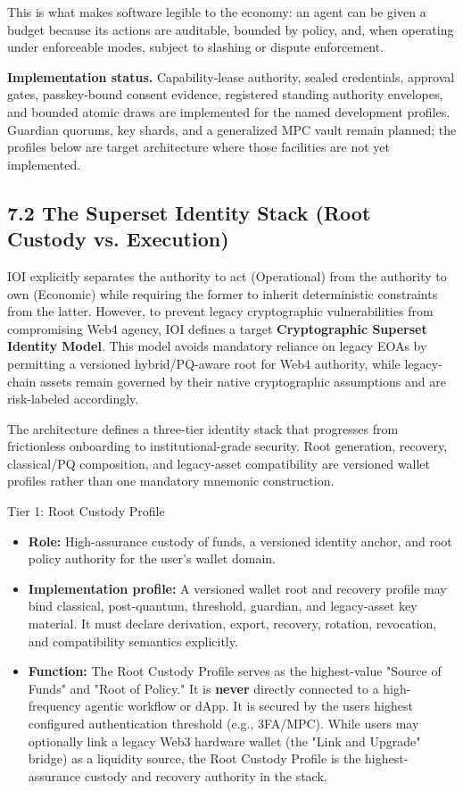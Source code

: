 \documentclass[
  11pt,
]{article}
\providecommand{\tightlist}{%
  \setlength{\itemsep}{0pt}\setlength{\parskip}{0pt}}
\begin{document}
This is what makes software legible to the economy: an agent can be
given a budget because its actions are auditable, bounded by policy,
and, when operating under enforceable modes, subject to slashing or
dispute enforcement.

\textbf{Implementation status.} Capability-lease authority, sealed
credentials, approval gates, passkey-bound consent evidence, registered
standing authority envelopes, and bounded atomic draws are implemented for the
named development profiles. Guardian quorums, key shards, and a generalized MPC
vault remain planned; the profiles below are target architecture where those
facilities are not yet implemented.

\hypertarget{the-superset-identity-stack-master-vs.-ops}{%
\subsection{7.2 The Superset Identity Stack (Root Custody vs.
Execution)}\label{the-superset-identity-stack-master-vs.-ops}}

IOI explicitly separates the authority to act (Operational) from the
authority to own (Economic) while requiring the former to inherit
deterministic constraints from the latter. However, to prevent legacy
cryptographic vulnerabilities from compromising Web4 agency, IOI
defines a target \textbf{Cryptographic Superset Identity Model}. This model
avoids mandatory reliance on legacy EOAs by permitting a versioned
hybrid/PQ-aware
root for Web4 authority, while legacy-chain assets remain governed by
their native cryptographic assumptions and are risk-labeled accordingly.

The architecture defines a three-tier identity stack that progresses from
frictionless onboarding to institutional-grade security. Root generation,
recovery, classical/PQ composition, and legacy-asset compatibility are
versioned wallet profiles rather than one mandatory mnemonic construction.

Tier 1: Root Custody Profile

\begin{itemize}
\tightlist
\item
  \textbf{Role:} High-assurance custody of funds, a versioned identity
  anchor, and root policy authority for the user's wallet domain.
\item
  \textbf{Implementation profile:} A versioned wallet root and recovery
  profile may bind classical, post-quantum, threshold, guardian, and
  legacy-asset key material. It must declare derivation, export, recovery,
  rotation, revocation, and compatibility semantics explicitly.
\item
  \textbf{Function:} The Root Custody Profile serves as the highest-value
  "Source of Funds" and "Root of Policy." It is \textbf{never} directly
  connected to a high-frequency agentic workflow or dApp. It is secured
  by the user\textquotesingle s highest configured authentication
  threshold (e.g., 3FA/MPC). While users may optionally link a legacy
  Web3 hardware wallet (the "Link and Upgrade" bridge) as a liquidity
  source, the Root Custody Profile is the highest-assurance custody and
  recovery authority in the stack.
\end{itemize}
\end{document}
